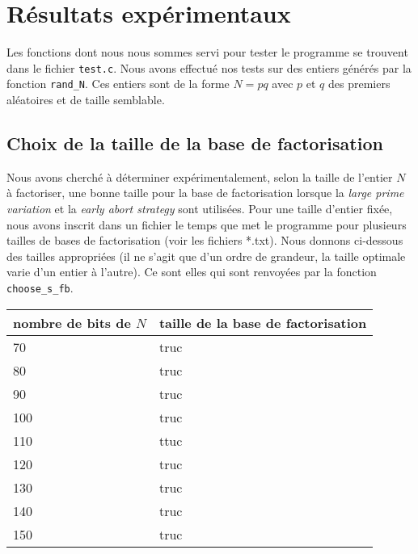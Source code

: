 \section{Résultats expérimentaux}

Les fonctions dont nous nous sommes servi pour tester le programme se trouvent
dans le fichier \texttt{test.c}. Nous avons effectué nos tests sur des entiers
générés par la fonction \texttt{rand\_N}. Ces entiers sont de la forme $N = pq$
avec $p$ et $q$ des premiers aléatoires et de taille semblable. 

\subsection{Choix de la taille de la base de factorisation}

Nous avons cherché à déterminer expérimentalement, selon la taille de l'entier
$N$ à factoriser, une bonne taille pour la base de factorisation lorsque la \textit{large
prime variation} et la \textit{early abort strategy} sont utilisées. Pour une
taille d'entier fixée, nous avons inscrit dans un fichier le temps que met le
programme pour plusieurs tailles de bases de factorisation (voir les fichiers
*.txt). Nous donnons ci-dessous des tailles appropriées (il ne s'agit que d'un
ordre de grandeur, la taille optimale varie d'un entier à l'autre). Ce sont
elles qui sont renvoyées par la fonction \texttt{choose\_s\_fb}.

\begin{center}
    \begin{tabular}{ |l |l | }
        \hline
         nombre de bits de $N$ & taille de la base de factorisation \\ \hline
         70                    & truc                               \\ \hline
         80                    & truc                               \\ \hline
         90                    & truc                               \\ \hline 
         100                   & truc                               \\ \hline 
         110                   & ttuc                               \\ \hline 
         120                   & truc                               \\ \hline 
         130                   & truc                               \\ \hline 
         140                   & truc                               \\ \hline 
         150                   & truc                               \\ \hline
    \end{tabular}
\end{center}

